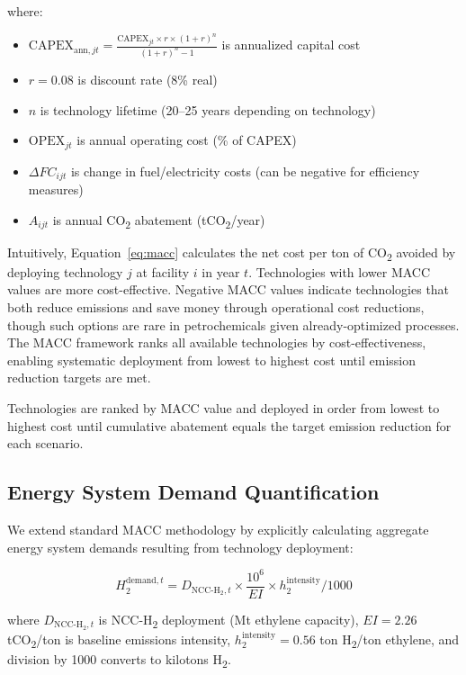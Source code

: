 \documentclass[11pt,a4paper]{article}
\begin{document}
\noindent where:
\begin{itemize}
\item $\text{CAPEX}_{\text{ann},jt} = \frac{\text{CAPEX}_{jt} \times r \times (1+r)^n}{(1+r)^n - 1}$ is annualized capital cost
\item $r = 0.08$ is discount rate (8\% real)
\item $n$ is technology lifetime (20--25 years depending on technology)
\item $\text{OPEX}_{jt}$ is annual operating cost (\% of CAPEX)
\item $\Delta FC_{ijt}$ is change in fuel/electricity costs (can be negative for efficiency measures)
\item $A_{ijt}$ is annual CO\textsubscript{2} abatement (tCO\textsubscript{2}/year)
\end{itemize}

Intuitively, Equation~\ref{eq:macc} calculates the net cost per ton of CO\textsubscript{2} avoided by deploying technology $j$ at facility $i$ in year $t$. Technologies with lower MACC values are more cost-effective. Negative MACC values indicate technologies that both reduce emissions and save money through operational cost reductions, though such options are rare in petrochemicals given already-optimized processes. The MACC framework ranks all available technologies by cost-effectiveness, enabling systematic deployment from lowest to highest cost until emission reduction targets are met.

Technologies are ranked by MACC value and deployed in order from lowest to highest cost until cumulative abatement equals the target emission reduction for each scenario.

\subsection{Energy System Demand Quantification}

We extend standard MACC methodology by explicitly calculating aggregate energy system demands resulting from technology deployment:

\begin{equation}
H_2^{\text{demand},t} = D_{\text{NCC-H}_2,t} \times \frac{10^6}{EI} \times h_2^{\text{intensity}} / 1000
\label{eq:h2demand}
\end{equation}

\noindent where $D_{\text{NCC-H}_2,t}$ is NCC-H\textsubscript{2} deployment (Mt ethylene capacity), $EI = 2.26$ tCO\textsubscript{2}/ton is baseline emissions intensity, $h_2^{\text{intensity}} = 0.56$ ton H\textsubscript{2}/ton ethylene, and division by 1000 converts to kilotons H\textsubscript{2}.
\end{document}
